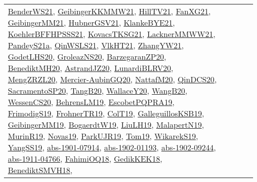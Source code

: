 {\begin{longtable}{lp{3cm}>{\raggedright}p{6cm}>{\raggedright}p{6cm}p{8cm}}
\href{papers/BenderWS21.pdf}{BenderWS21}\cite{BenderWS21}, \href{papers/GeibingerKKMMW21.pdf}{GeibingerKKMMW21}\cite{GeibingerKKMMW21}, \href{papers/HillTV21.pdf}{HillTV21}\cite{HillTV21}, \href{articles/FanXG21.pdf}{FanXG21}\cite{FanXG21}, \href{papers/GeibingerMM21.pdf}{GeibingerMM21}\cite{GeibingerMM21}, \href{articles/HubnerGSV21.pdf}{HubnerGSV21}\cite{HubnerGSV21}, \href{papers/KlankeBYE21.pdf}{KlankeBYE21}\cite{KlankeBYE21}, \href{articles/KoehlerBFFHPSSS21.pdf}{KoehlerBFFHPSSS21}\cite{KoehlerBFFHPSSS21}, \href{papers/KovacsTKSG21.pdf}{KovacsTKSG21}\cite{KovacsTKSG21}, \href{papers/LacknerMMWW21.pdf}{LacknerMMWW21}\cite{LacknerMMWW21}, \href{articles/PandeyS21a.pdf}{PandeyS21a}\cite{PandeyS21a}, \href{articles/QinWSLS21.pdf}{QinWSLS21}\cite{QinWSLS21}, \href{articles/VlkHT21.pdf}{VlkHT21}\cite{VlkHT21}, \href{articles/ZhangYW21.pdf}{ZhangYW21}\cite{ZhangYW21}, \href{papers/GodetLHS20.pdf}{GodetLHS20}\cite{GodetLHS20}, \href{papers/GroleazNS20.pdf}{GroleazNS20}\cite{GroleazNS20}, \href{papers/BarzegaranZP20.pdf}{BarzegaranZP20}\cite{BarzegaranZP20}, \href{articles/BenediktMH20.pdf}{BenediktMH20}\cite{BenediktMH20}, \href{articles/AstrandJZ20.pdf}{AstrandJZ20}\cite{AstrandJZ20}, \href{articles/LunardiBLRV20.pdf}{LunardiBLRV20}\cite{LunardiBLRV20}, \href{articles/MengZRZL20.pdf}{MengZRZL20}\cite{MengZRZL20}, \href{papers/Mercier-AubinGQ20.pdf}{Mercier-AubinGQ20}\cite{Mercier-AubinGQ20}, \href{papers/NattafM20.pdf}{NattafM20}\cite{NattafM20}, \href{articles/QinDCS20.pdf}{QinDCS20}\cite{QinDCS20}, \href{articles/SacramentoSP20.pdf}{SacramentoSP20}\cite{SacramentoSP20}, \href{papers/TangB20.pdf}{TangB20}\cite{TangB20}, \href{articles/WallaceY20.pdf}{WallaceY20}\cite{WallaceY20}, \href{papers/WangB20.pdf}{WangB20}\cite{WangB20}, \href{papers/WessenCS20.pdf}{WessenCS20}\cite{WessenCS20}, \href{papers/BehrensLM19.pdf}{BehrensLM19}\cite{BehrensLM19}, \href{articles/EscobetPQPRA19.pdf}{EscobetPQPRA19}\cite{EscobetPQPRA19}, \href{papers/FrimodigS19.pdf}{FrimodigS19}\cite{FrimodigS19}, \href{papers/FrohnerTR19.pdf}{FrohnerTR19}\cite{FrohnerTR19}, \href{papers/ColT19.pdf}{ColT19}\cite{ColT19}, \href{papers/GalleguillosKSB19.pdf}{GalleguillosKSB19}\cite{GalleguillosKSB19}, \href{papers/GeibingerMM19.pdf}{GeibingerMM19}\cite{GeibingerMM19}, \href{papers/BogaerdtW19.pdf}{BogaerdtW19}\cite{BogaerdtW19}, \href{papers/LiuLH19.pdf}{LiuLH19}\cite{LiuLH19}, \href{papers/MalapertN19.pdf}{MalapertN19}\cite{MalapertN19}, \href{papers/MurinR19.pdf}{MurinR19}\cite{MurinR19}, \href{articles/Novas19.pdf}{Novas19}\cite{Novas19}, \href{papers/ParkUJR19.pdf}{ParkUJR19}\cite{ParkUJR19}, \href{papers/Tom19.pdf}{Tom19}\cite{Tom19}, \href{articles/WikarekS19.pdf}{WikarekS19}\cite{WikarekS19}, \href{papers/YangSS19.pdf}{YangSS19}\cite{YangSS19}, \href{articles/abs-1901-07914.pdf}{abs-1901-07914}\cite{abs-1901-07914}, \href{articles/abs-1902-01193.pdf}{abs-1902-01193}\cite{abs-1902-01193}, \href{articles/abs-1902-09244.pdf}{abs-1902-09244}\cite{abs-1902-09244}, \href{articles/abs-1911-04766.pdf}{abs-1911-04766}\cite{abs-1911-04766}, \href{articles/FahimiOQ18.pdf}{FahimiOQ18}\cite{FahimiOQ18}, \href{articles/GedikKEK18.pdf}{GedikKEK18}\cite{GedikKEK18}, \href{papers/BenediktSMVH18.pdf}{BenediktSMVH18}\cite{BenediktSMVH18}, 
\end{longtable}}
